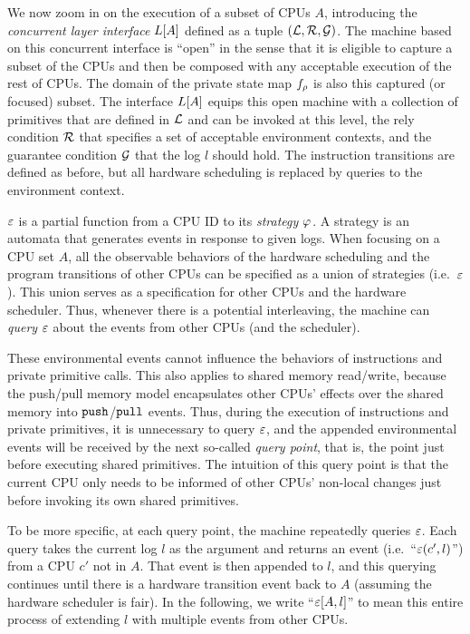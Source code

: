 We now zoom in on the execution of a subset of CPUs $A$,
introducing the \emph{concurrent layer interface} $\PLayer{L}{A}{\oracle}$
defined as a tuple
$(\Layer, \Rely, \Guard)$.
The machine based on this concurrent interface is ``open'' in the sense that it is eligible to  capture  a subset of the
CPUs and then be composed with any acceptable execution of the rest of CPUs. 
The domain of the private state map $f_\regs$ is also this captured (or focused) subset.
The interface $\PLayer{L}{A}{\oracle}$  equips this open machine with a 
collection of primitives that  are defined in $\Layer $ and can be invoked  at this level,
the rely condition $\Rely$  that
specifies a set of acceptable environment 
contexts, and
the guarantee condition $\Guard$
 that the log $l$ should hold.
The instruction transitions are defined as before,
but all hardware scheduling is replaced by queries to
the environment context.

 $\oracle$
is a partial function from a CPU ID to its \emph{strategy} $\strat{}$. A strategy is an automata
that generates events in response to given logs. 
When focusing on a CPU set $A$, all the observable behaviors of the hardware scheduling
and the program transitions of other CPUs
can be specified as a union of strategies (i.e.\, $\oracle$).
This union serves
as a specification for other CPUs and the hardware scheduler.
Thus,
whenever there is a potential interleaving,
the machine can \emph{query} $\oracle$ about the events from other CPUs (and the  scheduler).

These environmental events cannot influence the behaviors
of  instructions and private primitive calls. This also applies to
shared memory read/write, because the push/pull memory model encapsulates
other CPUs' effects over the shared memory into $\push$/$\pull$ events.
Thus, during the execution of instructions
and private primitives, it is unnecessary to query $\oracle$, and the appended environmental events will be received by the next
so-called \emph{query point}, that is, the point just
before executing shared primitives.
The intuition of this query point is that
the current CPU only needs to be informed of other CPUs' non-local changes
just before invoking its own shared primitives.

To be more specific, at each query point, the machine repeatedly
queries $\oracle$.
Each query takes the current log $l$
as the argument and returns an event (i.e.\, ``$\oracle(c', l)$'') from a CPU $c'$ not in
$A$. That event is then appended to $l$, and this querying continues
until there is a hardware transition event back to $A$ (assuming the hardware scheduler is fair).
In the following, we write
``$\Query{\oracle}{l}{A}$'' to mean this entire process of extending $l$ with
multiple events from other CPUs. 

